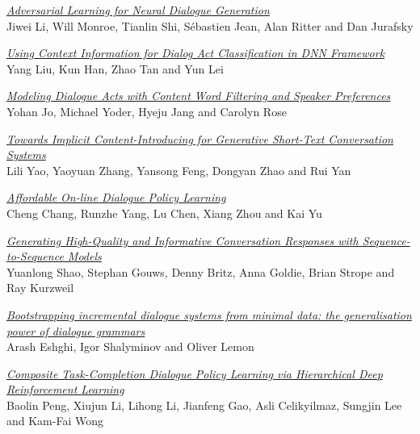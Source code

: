 \hyperlink{page.2140}{\em Adversarial Learning for Neural Dialogue Generation}\samepage \\
\hspace*{7mm} Jiwei Li, Will Monroe, Tianlin Shi, S\'ebastien Jean, Alan Ritter and Dan Jurafsky\dotfill {}

\hyperlink{page.2153}{\em Using Context Information for Dialog Act Classification in DNN Framework}\samepage \\
\hspace*{7mm} Yang Liu, Kun Han, Zhao Tan and Yun Lei\dotfill {}

\hyperlink{page.2162}{\em Modeling Dialogue Acts with Content Word Filtering and Speaker Preferences}\samepage \\
\hspace*{7mm} Yohan Jo, Michael Yoder, Hyeju Jang and Carolyn Rose\dotfill {}

\hyperlink{page.2173}{\em Towards Implicit Content-Introducing for Generative Short-Text Conversation Systems}\samepage \\
\hspace*{7mm} Lili Yao, Yaoyuan Zhang, Yansong Feng, Dongyan Zhao and Rui Yan\dotfill {}

\hyperlink{page.2183}{\em Affordable On-line Dialogue Policy Learning}\samepage \\
\hspace*{7mm} Cheng Chang, Runzhe Yang, Lu Chen, Xiang Zhou and Kai Yu\dotfill {}

\hyperlink{page.2193}{\em Generating High-Quality and Informative Conversation Responses with Sequence-to-Sequence Models}\samepage \\
\hspace*{7mm} Yuanlong Shao, Stephan Gouws, Denny Britz, Anna Goldie, Brian Strope and Ray Kurzweil\dotfill {}

\hyperlink{page.2203}{\em Bootstrapping incremental dialogue systems from minimal data: the generalisation power of dialogue grammars}\samepage \\
\hspace*{7mm} Arash Eshghi, Igor Shalyminov and Oliver Lemon\dotfill {}

\hyperlink{page.2214}{\em Composite Task-Completion Dialogue Policy Learning via Hierarchical Deep Reinforcement Learning}\samepage \\
\hspace*{7mm} Baolin Peng, Xiujun Li, Lihong Li, Jianfeng Gao, Asli Celikyilmaz, Sungjin Lee and Kam-Fai Wong\dotfill {}

